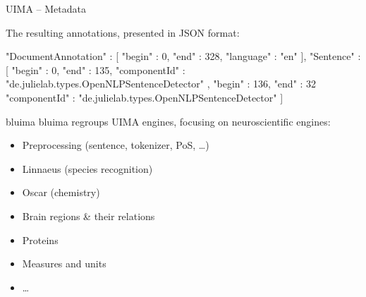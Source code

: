 \documentclass[10pt, compress, xcolor={usenames,dvipsnames}]{beamer}
\newcommand{\SmallArrow}{\ding{228}}
\newcommand{\BigArrow}{$\Longrightarrow$} %
\renewcommand{\emph}[1]{\alert{#1}}
\begin{document}
%
%
%
%


\begin{frame}[fragile]{UIMA -- Metadata}

  The resulting annotations, presented in JSON format:

  \vspace{1em}

  \begin{lstjson}
"DocumentAnnotation" : [
  { "begin" : 0,    "end" : 328,  "language" : "en" }
],
"Sentence" : [
  { "begin" : 0,    "end" : 135,
    "componentId" :
        "de.julielab.types.OpenNLPSentenceDetector" },
  { "begin" : 136,  "end" : 32
    "componentId" :
        "de.julielab.types.OpenNLPSentenceDetector" }
]
  \end{lstjson}

\end{frame}

\begin{frame}[fragile]{bluima}
  bluima regroups UIMA engines, focusing on neuroscientific engines:

  \begin{itemize}[label=\SmallArrow]

    \item Preprocessing (sentence, tokenizer, PoS, \ldots)

    \item Linnaeus (species recognition)

    \item Oscar (chemistry)

    \item \emph{Brain regions \& their relations}

    \item Proteins

    \item Measures and units

    \item \ldots

  \end{itemize}

\end{frame}
\end{document}
